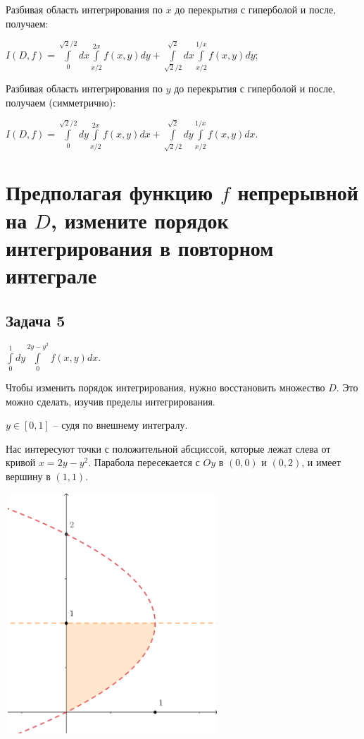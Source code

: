 \documentclass[a4paper, fleqn]{article}
\begin{document}
    Разбивая область интегрирования по $x$ до перекрытия с гиперболой и после, получаем:
    
    $I(D, f) = \displaystyle \int\limits_{0}^{\sqrt{2}/2}dx \int\limits_{x/2}^{2x} f(x, y)dy + \displaystyle \int\limits_{\sqrt{2}/2}^{\sqrt{2}}dx \int\limits_{x/2}^{1/x} f(x, y)dy$;
    
    Разбивая область интегрирования по $y$ до перекрытия с гиперболой и после, получаем (симметрично):
    
    $I(D, f) = \displaystyle \int\limits_{0}^{\sqrt{2}/2}dy \int\limits_{x/2}^{2x} f(x, y)dx + \displaystyle \int\limits_{\sqrt{2}/2}^{\sqrt{2}}dy \int\limits_{x/2}^{1/x} f(x, y)dx$.
    
    \section*{Предполагая функцию $f$ непрерывной на $D$, измените порядок интегрирования в повторном интеграле}
    \subsection*{Задача 5}
    
    $\int\limits_{0}^{1} dy \int\limits_{0}^{2y - y^2} f(x,y)dx.$
    
    Чтобы изменить порядок интегрирования, нужно восстановить множество $D$. Это можно сделать, изучив пределы интегрирования.
    
    $y \in [0, 1]$ -- судя по внешнему интегралу.
    
    Нас интересуют точки с положительной абсциссой, которые лежат слева от кривой $x = 2y - y^2.$ Парабола пересекается с $Oy$ в $(0, 0)$ и $(0,2)$, и имеет вершину  в $(1,1).$
    
    \includegraphics[width=8cm, height=9cm]{task_5.png}
\end{document}
